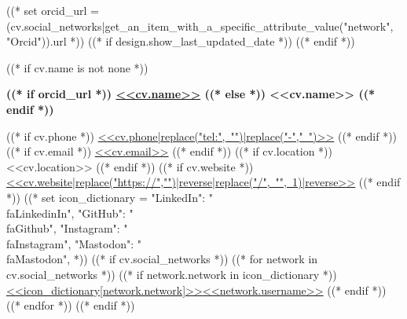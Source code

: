 ((* set orcid_url = (cv.social_networks|get_an_item_with_a_specific_attribute_value("network", "Orcid")).url *))
((* if design.show_last_updated_date *))
\placelastupdatedtext
((* endif *))

((* if cv.name is not none *))
{
    \centering
    \textbf{\fontsize{<<design.header_font_size>>}{<<design.header_font_size>>}\selectfont
        ((* if orcid_url *))
        \href{<<orcid_url>>}{<<cv.name>>}
        ((* else *))
        <<cv.name>>
        ((* endif *))
    } \\ \vspace{3pt}
    \small

    \vspace{<<design.margins.header.vertical_between_name_and_connections>>}
    
    \begin{spacing}{1.6}
    ((* if cv.phone *))
    \mbox{\href{<<cv.phone|replace("-","")>>}{{\footnotesize\faPhone*}\hspace{4pt}<<cv.phone|replace("tel:", "")|replace("-"," ")>>}}
    \hspace{<<design.margins.header.horizontal_between_connections>>}
    ((* endif *))
    ((* if cv.email *))
    \mbox{\href{mailto:<<cv.email>>}{{\small\faEnvelope[regular]}\hspace{4pt}<<cv.email>>}}
    \hspace{<<design.margins.header.horizontal_between_connections>>}
    ((* endif *))
    ((* if cv.location *))
    \mbox{{\small\faMapMarker*}\hspace{4pt}<<cv.location>>}
    \hspace{<<design.margins.header.horizontal_between_connections>>}
    ((* endif *))
    ((* if cv.website *))
    \mbox{\href{<<cv.website>>}{{\small\faLink}\hspace{4pt}<<cv.website|replace("https://","")|reverse|replace("/", "", 1)|reverse>>}}
    \hspace{<<design.margins.header.horizontal_between_connections>>}
    ((* endif *))
    ((*
        set icon_dictionary = {
            "LinkedIn": "\\faLinkedinIn",
            "GitHub": "\\faGithub",
            "Instagram": "\\faInstagram",
            "Mastodon": "\\faMastodon",
        }
    *))
    ((* if cv.social_networks *))
        ((* for network in cv.social_networks *))
            ((* if network.network in icon_dictionary *))
    \mbox{\href{<<network.url>>}{{\small<<icon_dictionary[network.network]>>}\hspace{4pt}<<network.username>>}}
    \hspace*{<<design.margins.header.horizontal_between_connections>>}
            ((* endif *))
        ((* endfor *))
    ((* endif *))
    \end{spacing}
    \par
}

